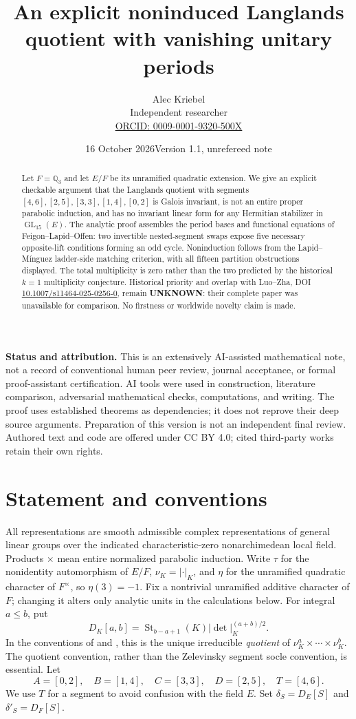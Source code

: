 \documentclass[11pt]{article}
\title{An explicit noninduced Langlands quotient with vanishing unitary periods}
\author{Alec Kriebel\\Independent researcher\\
\small\href{https://orcid.org/0009-0001-9320-500X}{ORCID: 0009-0001-9320-500X}}
\date{16 October 2026\quad Version 1.1, unrefereed note}
\newcommand{\GL}{\operatorname{GL}}
\newcommand{\St}{\operatorname{St}}
\newcommand{\Q}{\mathbb Q}
\begin{document}
\maketitle
\begin{abstract}
Let $F=\Q_3$ and let $E/F$ be its unramified quadratic extension. We give an explicit checkable argument that the Langlands quotient with segments
$[4,6],[2,5],[3,3],[1,4],[0,2]$ is Galois invariant, is not an entire proper parabolic induction, and has no invariant linear form for any Hermitian stabilizer in $\GL_{15}(E)$. The analytic proof assembles the period bases and functional equations of Feigon--Lapid--Offen: two invertible nested-segment swaps expose five necessary opposite-lift conditions forming an odd cycle. Noninduction follows from the Lapid--M\'inguez ladder-side matching criterion, with all fifteen partition obstructions displayed. The total multiplicity is zero rather than the two predicted by the historical $k=1$ multiplicity conjecture. Historical priority and overlap with Luo--Zha, DOI \href{https://doi.org/10.1007/s11464-025-0256-0}{10.1007/s11464-025-0256-0}, remain \textbf{UNKNOWN}: their complete paper was unavailable for comparison. No firstness or worldwide novelty claim is made.
\end{abstract}

\noindent\textbf{Status and attribution.} This is an extensively AI-assisted mathematical note, not a record of conventional human peer review, journal acceptance, or formal proof-assistant certification. AI tools were used in construction, literature comparison, adversarial mathematical checks, computations, and writing. The proof uses established theorems as dependencies; it does not reprove their deep source arguments. Preparation of this version is not an independent final review. Authored text and code are offered under CC BY 4.0; cited third-party works retain their own rights.

\section{Statement and conventions}
All representations are smooth admissible complex representations of general linear groups over the indicated characteristic-zero nonarchimedean local field. Products $\times$ mean entire normalized parabolic induction. Write $\tau$ for the nonidentity automorphism of $E/F$, $\nu_K=|\cdot|_K$, and $\eta$ for the unramified quadratic character of $F^\times$, so $\eta(3)=-1$. Fix a nontrivial unramified additive character of $F$; changing it alters only analytic units in the calculations below. For integral $a\le b$, put
\[
D_K[a,b]=\St_{b-a+1}(K)|\det|_K^{(a+b)/2}.
\]
In the conventions of \cite[\S1.5]{FLO} and \cite[\S2.3]{LM16}, this is the unique irreducible \emph{quotient} of $\nu_K^a\times\cdots\times\nu_K^b$. The quotient convention, rather than the Zelevinsky segment socle convention, is essential. Let
\[
A=[0,2],\quad B=[1,4],\quad C=[3,3],\quad D=[2,5],\quad T=[4,6].
\]
We use $T$ for a segment to avoid confusion with the field $E$. Set $\delta_S=D_E[S]$ and $\delta'_S=D_F[S]$.
\end{document}
